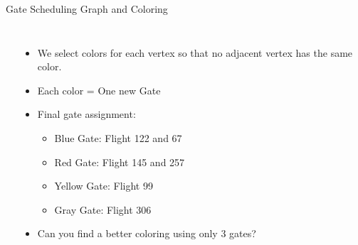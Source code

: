 \begin{frame}{Gate Scheduling Graph and Coloring}
    \begin{columns}
      \begin{center}
    \end{center}
      \begin{itemize}
      \item We select colors for each vertex so that no adjacent
        vertex has the same color.

        \bigskip

      \item Each color = One new Gate

        \bigskip

      \item Final gate assignment:
        \begin{itemize}
        \item Blue Gate: Flight 122 and 67
        \item Red Gate: Flight 145 and 257
        \item Yellow Gate: Flight 99
        \item Gray Gate: Flight 306
        \end{itemize}

        \bigskip

      \item Can you find a better coloring using
        only \alert{3 gates}?
      \end{itemize}
    \end{columns}
\end{frame}

